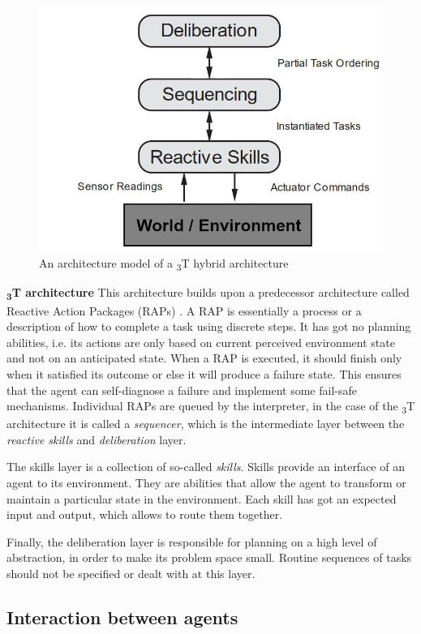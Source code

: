 \documentclass[0main.tex]{subfiles}
\begin{document}
\begin{figure}[htbp]
    \centering
    \includegraphics[width=.65\textwidth]{3t-arch-unified.png}
    \caption{An architecture model of a \textsubscript{3}T hybrid architecture}
    \label{3-arch}
\end{figure}

\textbf{\textsubscript{3}T architecture}\newline
This architecture builds upon a predecessor architecture called Reactive Action Packages (RAPs)
\cite{Firby1987}. A RAP is essentially a process or a description of how to complete a task using
discrete steps. It has got no planning abilities, i.e. its actions are only based on
current perceived environment state and not on an anticipated state. When a RAP is executed, it
should finish only when it satisfied its outcome or else it will produce a failure state. This
ensures that the agent can self-diagnose a failure and implement some fail-safe mechanisms.
Individual RAPs are queued by the interpreter, in the case of the \textsubscript{3}T architecture it
is called a \emph{sequencer}, which is the intermediate layer between the \emph{reactive skills} and 
\emph{deliberation} layer.

The skills layer is a collection of so-called \emph{skills}. Skills provide an interface of an agent 
to its environment. They are abilities that allow the agent to transform or maintain a particular 
state in the environment. Each skill has got an expected input and output, which allows to route them 
together. 

Finally, the deliberation layer is responsible for planning on a high level of abstraction, in 
order to make its problem space small. Routine sequences of tasks should not be specified or 
dealt with at this layer. 

\subsection{Interaction between agents}\label{mas-interaction}
\end{document}
